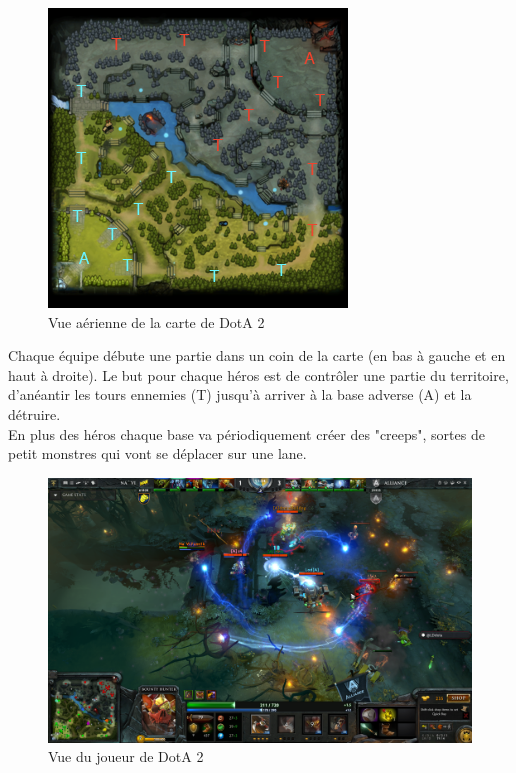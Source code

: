 \documentclass{article}
\begin{document}
\begin{figure}[h]
\begin{center}
	\includegraphics[scale=1]{"minimap.png"} 
	\caption{Vue aérienne de la carte de DotA 2}
\end{center}
\end{figure}	

Chaque équipe débute une partie dans un coin de la carte (en bas à gauche et en haut à droite). Le but pour chaque héros est de contrôler une partie du territoire, d'anéantir les tours ennemies (T) jusqu'à arriver à la base adverse (A) et la détruire.\\

En plus des héros chaque base va périodiquement créer des "creeps", sortes de petit monstres qui vont se déplacer sur une lane.
\begin{figure}[h]
\begin{center}
	\includegraphics[scale=0.25]{"dota2screen.png"} 
	\caption{Vue du joueur de DotA 2}
\end{center}
\end{figure}
\end{document}
